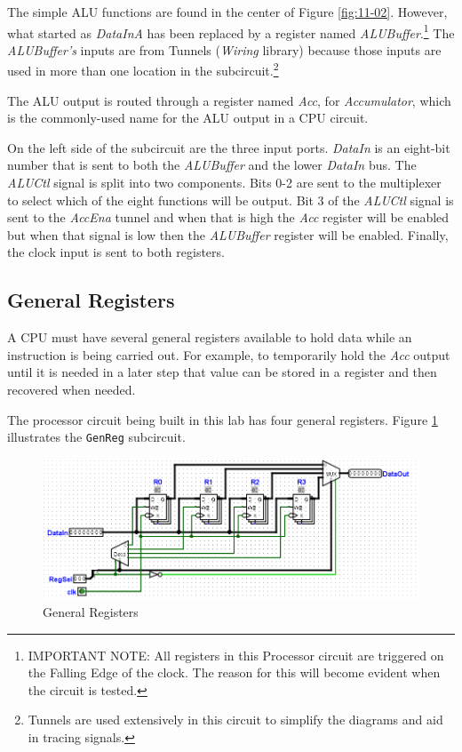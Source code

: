 The simple \ac{ALU} functions are found in the center of Figure \ref{fig:11-02}. However, what started as \textit{DataInA} has been replaced by a register named \textit{ALUBuffer}.\footnote{IMPORTANT NOTE: All registers in this Processor circuit are triggered on the Falling Edge of the clock. The reason for this will become evident when the circuit is tested.} The \textit{ALUBuffer's} inputs are from Tunnels (\textit{Wiring} library) because those inputs are used in more than one location in the subcircuit.\footnote{Tunnels are used extensively in this circuit to simplify the diagrams and aid in tracing signals.}

The \ac{ALU} output is routed through a register named \textit{Acc}, for \textit{Accumulator}, which is the commonly-used name for the \ac{ALU} output in a \ac{CPU} circuit.

On the left side of the subcircuit are the three input ports. \textit{DataIn} is an eight-bit number that is sent to both the \textit{ALUBuffer} and the lower \textit{DataIn} bus. The \textit{ALUCtl} signal is split into two components. Bits 0-2 are sent to the multiplexer to select which of the eight functions will be output. Bit 3 of the \textit{ALUCtl} signal is sent to the \textit{AccEna} tunnel and when that is high the \textit{Acc} register will be enabled but when that signal is low then the \textit{ALUBuffer} register will be enabled. Finally, the clock input is sent to both registers.

\subsection{General Registers}

A \ac{CPU} must have several general registers available to hold data while an instruction is being carried out. For example, to temporarily hold the \textit{Acc} output until it is needed in a later step that value can be stored in a register and then recovered when needed. 

The processor circuit being built in this lab has four general registers. Figure \ref{fig:11-03} illustrates the \lstinline[columns=fixed]|GenReg| subcircuit.

\begin{figure}[H]
	\centering
	\includegraphics[width=\maxwidth{.95\linewidth}]{gfx/11-03}
	\caption{General Registers}
	\label{fig:11-03}
\end{figure}

